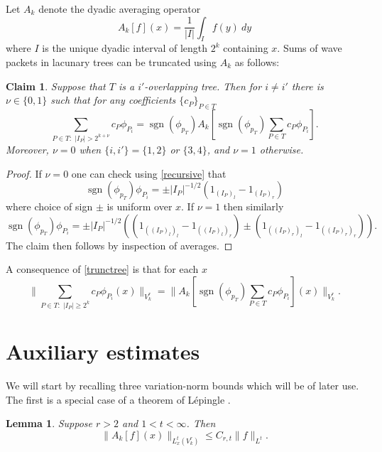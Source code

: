 \documentclass[12pt]{amsart}
\numberwithin{equation}{section}
\newcommand {\sgn}{\mathop{\mathrm{sgn}}}
\newtheorem{claim}[theorem]{Claim}
\newtheorem{lemma}[theorem]{Lemma}
\begin{document}
Let $A_k$ denote the dyadic averaging operator
\[
A_k[f](x) = \frac{1}{|I|} \int_{I} f(y)\ dy
\]
where $I$ is the unique dyadic interval of length $2^k$ containing $x$. Sums of wave packets in lacunary trees can be truncated using $A_k$ as follows:
\begin{claim} \label{averageclaim}
Suppose that $T$ is a $i'$-overlapping tree. Then for $i \neq i'$ there is $\nu\in \{0,1\}$ such that for any coefficients $\{c_P\}_{P \in T}$
\begin{equation} \label{trunctree}
\sum_{P \in T: \, \, |I_P| > 2^{k + \nu} } c_P \phi_{P_i} = \sgn(\phi_{p_T}) A_{k}[\sgn(\phi_{p_T} ) \sum_{P \in T} c_P \phi_{P_i}].
\end{equation}
Moreover, $\nu = 0$ when $\{i,i'\}=\{1,2\}$ or $\{3,4\}$, and $\nu = 1$ otherwise.
\end{claim}

\begin{proof}
If $\nu = 0$ one can check using \eqref{recursive} that 
\[
\sgn(\phi_{p_T})\phi_{P_i} = \pm|I_P|^{-1/2}(1_{(I_{P})_l} - 1_{(I_{P})_r}) 
\]
where choice of sign $\pm$ is uniform over $x$. If $\nu = 1$ then similarly
\[
\sgn(\phi_{p_T}) \phi_{P_i} = \pm|I_P|^{-1/2}\left((1_{((I_{P})_l)_l} - 1_{((I_{P})_l)_r}) \pm(1_{((I_{P})_r)_l} - 1_{((I_{P})_r)_r})\right).
\] 
The claim then follows by inspection of averages.
\end{proof}

A consequence of \eqref{trunctree} is that for each $x$
\begin{equation} \label{vartrunc}
\|\sum_{P \in T: \, \, |I_P| \geq 2^{k} } c_P \phi_{P_i}(x)\|_{V^r_k} = \|A_k[\sgn(\phi_{p_T} ) \sum_{P \in T} c_P \phi_{P_i}](x)\|_{V^r_k}.
\end{equation}



\section{Auxiliary estimates} \label{auxsection}

We will start by recalling three variation-norm bounds which will be of later use. The first is a special case of a theorem of L\'{e}pingle \cite{lepingle76lvd}. 
\begin{lemma} \label{leplemma}
Suppose $r > 2$ and $1 < t < \infty$. Then
\[
\|A_k[f](x)\|_{L^t_x(V^r_k)} \leq C_{r,t} \|f\|_{L^t}.
\]
\end{lemma}
\end{document}
